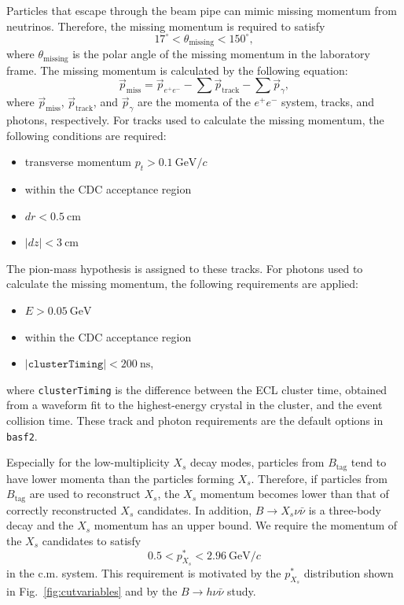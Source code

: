 Particles that escape through the beam pipe can mimic missing momentum from neutrinos.
Therefore, the missing momentum is required to satisfy
\begin{equation}
 17^\circ < \theta_{\textrm{missing}} < 150^\circ,
\end{equation}
where $\theta_{\textrm{missing}}$ is the polar angle of the missing momentum in the laboratory frame.
The missing momentum is calculated by the following equation:
\begin{equation}
 \vec{p}_{\textrm{miss}} = \vec{p}_{e^{+}e^{-}} - \sum{\vec{p}_{\textrm{track}}} - \sum{\vec{p}_{\gamma}},
\end{equation}
where $\vec{p}_{\textrm{miss}}$, $\vec{p}_{\textrm{track}}$, and $\vec{p}_{\gamma}$ are the momenta of the $e^{+}e^{-}$ system, tracks, and photons, respectively.
For tracks used to calculate the missing momentum, the following conditions are required:
\begin{itemize}
  \item transverse momentum $p_{t} > 0.1~\textrm{GeV}/c$
  \item within the CDC acceptance region
  \item $dr < 0.5~\textrm{cm}$
  \item $\left| dz \right| < 3~\textrm{cm}$
\end{itemize}
The pion-mass hypothesis is assigned to these tracks.
For photons used to calculate the missing momentum, the following requirements are applied:
\begin{itemize}
  \item $E > 0.05~\textrm{GeV}$
  \item within the CDC acceptance region
  \item $\left| \texttt{clusterTiming} \right| < 200~\textrm{ns}$,
\end{itemize}
where \texttt{clusterTiming} is the difference between the ECL cluster time, obtained from a waveform fit to the highest-energy crystal in the cluster, and the event collision time.
These track and photon requirements are the default options in \texttt{basf2}.

Especially for the low-multiplicity $X_{s}$ decay modes, particles from $B_{\textrm{tag}}$ tend to have lower momenta than the particles forming $X_{s}$.
Therefore, if particles from $B_{\textrm{tag}}$ are used to reconstruct $X_{s}$, the $X_{s}$ momentum becomes lower than that of correctly reconstructed $X_{s}$ candidates.
In addition, $B \rightarrow X_{s} \nu \bar{\nu}$ is a three-body decay and the $X_{s}$ momentum has an upper bound.
We require the momentum of the $X_{s}$ candidates to satisfy
\begin{equation}
  0.5 < p_{X_{s}}^{*} < 2.96~\textrm{GeV}/c
\end{equation}
in the c.m. system.
This requirement is motivated by the $p_{X_{s}}^{*}$ distribution shown in Fig.~\ref{fig:cutvariables} and by the $B \rightarrow h \nu \bar{\nu}$ study.

